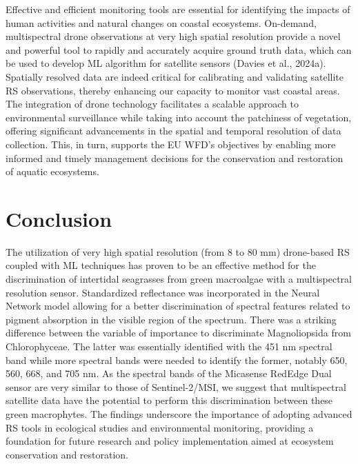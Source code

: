 \documentclass[
  letterpaper,
  11pt,
  english,
  singlespacing,
  headsepline]{MastersDoctoralThesis}
\newcommand{\chaptertopimage}{Chapter1/img/seagrasses.png}
\newcommand{\chapterbottomimage}{Chapter1/img/seagrasses.png}
\begin{document}
\begin{spacing}{1.5}
Effective and efficient monitoring tools are essential for identifying
the impacts of human activities and natural changes on coastal
ecosystems. On-demand, multispectral drone observations at very high
spatial resolution provide a novel and powerful tool to rapidly and
accurately acquire ground truth data, which can be used to develop ML
algorithm for satellite sensors (Davies et al., 2024a). Spatially
resolved data are indeed critical for calibrating and validating
satellite RS observations, thereby enhancing our capacity to monitor
vast coastal areas. The integration of drone technology facilitates a
scalable approach to environmental surveillance while taking into
account the patchiness of vegetation, offering significant advancements
in the spatial and temporal resolution of data collection. This, in
turn, supports the EU WFD's objectives by enabling more informed and
timely management decisions for the conservation and restoration of
aquatic ecosystems.

\section{Conclusion}\label{conclusion}

The utilization of very high spatial resolution (from 8 to 80 mm)
drone-based RS coupled with ML techniques has proven to be an effective
method for the discrimination of intertidal seagrasses from green
macroalgae with a multispectral resolution sensor. Standardized
reflectance was incorporated in the Neural Network model allowing for a
better discrimination of spectral features related to pigment absorption
in the visible region of the spectrum. There was a striking difference
between the variable of importance to discriminate Magnoliopsida from
Chlorophyceae. The latter was essentially identified with the 451 nm
spectral band while more spectral bands were needed to identify the
former, notably 650, 560, 668, and 705 nm. As the spectral bands of the
Micasense RedEdge Dual sensor are very similar to those of
Sentinel-2/MSI, we suggest that multispectral satellite data have the
potential to perform this discrimination between these green
macrophytes. The findings underscore the importance of adopting advanced
RS tools in ecological studies and environmental monitoring, providing a
foundation for future research and policy implementation aimed at
ecosystem conservation and restoration.

\end{spacing}

\renewcommand{\chaptertopimage}{Chapter4/img/Red_and_sky.png}
\renewcommand{\chapterbottomimage}{Chapter4/img/Red_and_tree.png}
\end{document}
